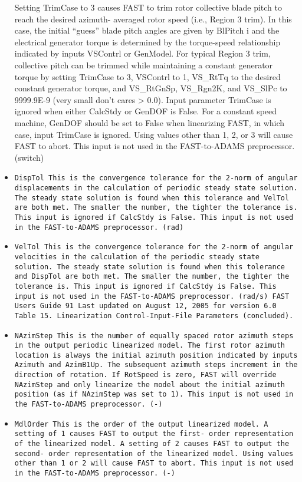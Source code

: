 \documentclass[11pt]{article}
\begin{document}
\begin{itemize}
Setting TrimCase to 3 causes FAST to trim rotor collective blade pitch to reach the desired azimuth-
averaged rotor speed (i.e., Region 3 trim). In this case, the initial “guess” blade pitch angles are
given by BlPitch i and the electrical generator torque is determined by the torque-speed
relationship indicated by inputs VSContrl or GenModel. For typical Region 3 trim, collective
pitch can be trimmed while maintaining a constant generator torque by setting TrimCase to 3,
VSContrl to 1, VS\_RtTq to the desired constant generator torque, and VS\_RtGnSp,
VS\_Rgn2K, and VS\_SlPc to 9999.9E-9 (very small don’t cares > 0.0). Input parameter
TrimCase is ignored when either CalcStdy or GenDOF is False. For a constant speed machine,
GenDOF should be set to False when linearizing FAST, in which case, input TrimCase is
ignored. Using values other than 1, 2, or 3 will cause FAST to abort. This input is not used in the
FAST-to-ADAMS preprocessor. (switch)


\item \tt{DispTol} This is the convergence tolerance for the 2-norm of angular displacements in the calculation of
periodic steady state solution. The steady state solution is found when this tolerance and VelTol
are both met. The smaller the number, the tighter the tolerance is. This input is ignored if
CalcStdy is False. This input is not used in the FAST-to-ADAMS preprocessor. (rad)

\item \tt{VelTol} This is the convergence tolerance for the 2-norm of angular velocities in the calculation of the
periodic steady state solution. The steady state solution is found when this tolerance and DispTol
are both met. The smaller the number, the tighter the tolerance is. This input is ignored if
CalcStdy is False. This input is not used in the FAST-to-ADAMS preprocessor. (rad/s)
FAST Users Guide 91 Last updated on August 12, 2005 for version 6.0
Table 15. Linearization Control-Input-File Parameters (concluded).



\item \tt{NAzimStep} This is the number of equally spaced rotor azimuth steps in the output periodic linearized model.
The first rotor azimuth location is always the initial azimuth position indicated by inputs Azimuth
and AzimB1Up. The subsequent azimuth steps increment in the direction of rotation. If
RotSpeed is zero, FAST will override NAzimStep and only linearize the model about the initial
azimuth position (as if NAzimStep was set to 1). This input is not used in the FAST-to-ADAMS
preprocessor. (-)

\item \tt{MdlOrder} This is the order of the output linearized model. A setting of 1 causes FAST to output the first-
order representation of the linearized model. A setting of 2 causes FAST to output the second-
order representation of the linearized model. Using values other than 1 or 2 will cause FAST to
abort. This input is not used in the FAST-to-ADAMS preprocessor. (-)
\end{itemize}
\end{document}
